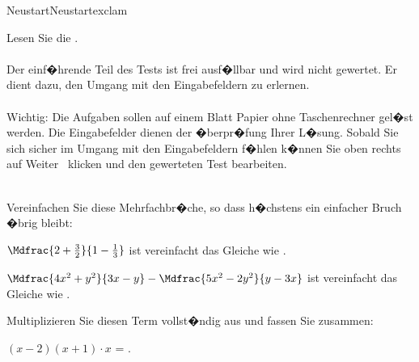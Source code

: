 
\begin{MXContent}{Neustart}{Neustart}{exclam}

Lesen Sie die .
\ \\ \ \\
Der einf�hrende Teil des Tests ist frei ausf�llbar und wird nicht gewertet. Er dient dazu, den Umgang mit den Eingabefeldern zu erlernen.
\ \\ \ \\
Wichtig: Die Aufgaben sollen auf einem Blatt Papier ohne Taschenrechner gel�st werden. Die Eingabefelder dienen der �berpr�fung Ihrer L�sung.
Sobald Sie sich sicher im Umgang mit den Eingabefeldern f�hlen k�nnen Sie oben rechts auf \glqq Weiter \grqq\ klicken und den gewerteten Test bearbeiten.
\ \\ \ \\


\begin{MExercise}
Vereinfachen Sie diese Mehrfachbr�che, so dass h�chstens ein einfacher Bruch �brig bleibt:
\begin{MExerciseItems}
\item{$\Mdfrac{2+\frac32}{1-\frac13}$ ist vereinfacht das Gleiche wie .\\}
\item{$\Mdfrac{4x^2+y^2}{3x-y}-\Mdfrac{5x^2-2y^2}{y-3x}$ ist vereinfacht das Gleiche wie .\\}
\end{MExerciseItems}
\end{MExercise}

\begin{MExercise}
Multiplizieren Sie diesen Term vollst�ndig aus und fassen Sie zusammen:

$(x-2)(x+1)\cdot x$ = .


\end{MExercise}
\end{MXContent}
